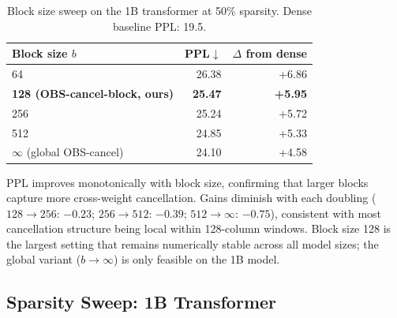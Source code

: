 \documentclass{article}
\begin{document}
\begin{table}[htbp]
  \centering
  \caption{%
    Block size sweep on the 1B transformer at 50\% sparsity.
    Dense baseline PPL: 19.5.
  }
  \label{tab:block}
  \small
  \begin{tabular}{lrr}
    \toprule
    Block size $b$ & PPL$\downarrow$ & $\Delta$ from dense \\
    \midrule
    64                                       & 26.38 & +6.86 \\
    \textbf{128 (OBS-cancel-block, ours)}    & \textbf{25.47} & \textbf{+5.95} \\
    256                                      & 25.24 & +5.72 \\
    512                                      & 24.85 & +5.33 \\
    $\infty$ (global OBS-cancel)             & 24.10 & +4.58 \\
    \bottomrule
  \end{tabular}
\end{table}

PPL improves monotonically with block size, confirming that larger blocks
capture more cross-weight cancellation. Gains diminish with each doubling
($128\to256$: $-0.23$; $256\to512$: $-0.39$; $512\to\infty$: $-0.75$),
consistent with most cancellation structure being local within 128-column
windows. Block size 128 is the largest setting that remains numerically
stable across all model sizes; the global variant ($b\to\infty$) is only
feasible on the 1B model.

\subsection{Sparsity Sweep: 1B Transformer}
\label{sec:sweep_1b}
\end{document}
